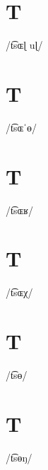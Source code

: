 \documentclass[10pt,a4paper,twoside]{book}
\begin{document}
\section*{T}

\begin{multicols}{3}
 {/t͡sɶɭ uɭ/} {}
\end{multicols}

\section*{T}

\begin{multicols}{3}
 {/t͡sɶˈɵ/} {}
\end{multicols}

\section*{T}

\begin{multicols}{3}
 {/t͡sɶʁ/} {}
\end{multicols}

\section*{T}

\begin{multicols}{3}
 {/t͡sɶχ/} {}
\end{multicols}

\section*{T}

\begin{multicols}{3}
 {/t͡sɵ/} {}
\end{multicols}

\section*{T}

\begin{multicols}{3}
 {/t͡sɵŋ/} {}
\end{multicols}
\end{document}
